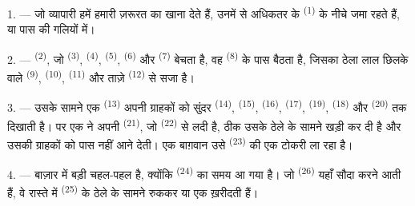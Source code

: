 
\VUsaut{4.0mm}
\VUsaut{3.0mm}

\VUsaut{3.0mm}

1. --- जो व्यापारी हमें हमारी ज़रूरत का खाना देते हैं, उनमें से अधिकतर
 के  \textsuperscript{(1)} के नीचे जमा रहते हैं, या
पास की गलियों में।

2. ---  \textsuperscript{(2)}, जो 
\textsuperscript{(3)},  \textsuperscript{(4)},
 \textsuperscript{(5)},  \textsuperscript{(6)}
और  \textsuperscript{(7)} बेचता है, वह
 \textsuperscript{(8)} के पास बैठता है, जिसका
ठेला लाल छिलके वाले  \textsuperscript{(9)},
 \textsuperscript{(10)}, 
\textsuperscript{(11)} और ताज़े  \textsuperscript{(12)} से
सजा है।

3. --- उसके सामने एक  \textsuperscript{(13)} अपनी
ग्राहकों को सुंदर  \textsuperscript{(14)}, 
\textsuperscript{(15)},  \textsuperscript{(16)}, 
\textsuperscript{(17)},  \textsuperscript{(19)}, 
\textsuperscript{(18)} और  \textsuperscript{(20)} तक दिखाती है।
पर एक  ने अपनी  \textsuperscript{(21)},
जो  \textsuperscript{(22)} से लदी है, ठीक उसके ठेले के सामने
खड़ी कर दी है और उसकी ग्राहकों को पास नहीं आने देती। एक बाग़वान उसे
 \textsuperscript{(23)} की एक टोकरी ला रहा है।

\VUsaut{4.0mm}
\VUsaut{3.0mm}

4. --- बाज़ार में बड़ी चहल-पहल है, क्योंकि  \textsuperscript{(24)}
का समय आ गया है। जो  \textsuperscript{(26)} यहाँ सौदा करने आती
हैं, वे रास्ते में  \textsuperscript{(25)} के ठेले के
सामने रुककर  या एक  ख़रीदती हैं।

